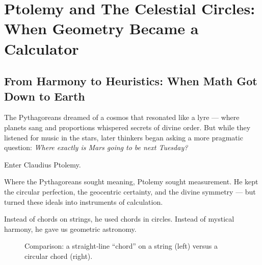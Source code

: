 \section{Ptolemy and The Celestial Circles: When Geometry Became a Calculator}

\subsection{From Harmony to Heuristics: When Math Got Down to Earth}

The Pythagoreans dreamed of a cosmos that resonated like a lyre — where planets sang and proportions whispered secrets of divine order. But while they listened for music in the stars, later thinkers began asking a more pragmatic question: \textit{Where exactly is Mars going to be next Tuesday?}

Enter Claudius Ptolemy.

Where the Pythagoreans sought meaning, Ptolemy sought measurement. He kept the circular perfection, the geocentric certainty, and the divine symmetry — but turned these ideals into instruments of calculation.

Instead of chords on strings, he used chords in circles. Instead of mystical harmony, he gave us geometric astronomy.

\begin{figure}[H]
    \centering
    \caption{Comparison: a straight‐line “chord” on a string (left) versus a circular chord (right).}
\end{figure}
  

